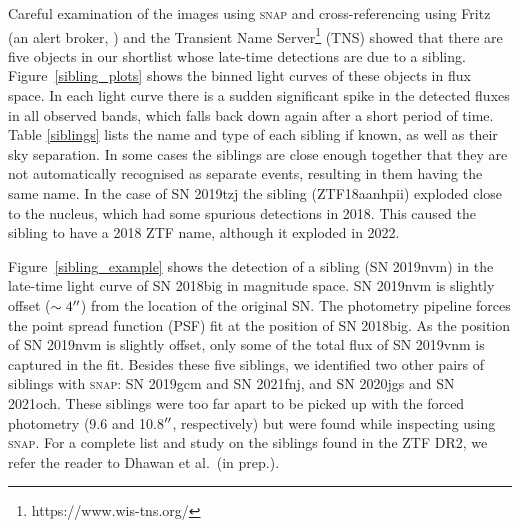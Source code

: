 \documentclass[a4paper,oneside,12pt, class=Latex/Classes/PhDthesisPSnPDF, crop=false]{standalone}
\begin{document}
Careful examination of the images using \textsc{snap} and cross-referencing using Fritz (an alert broker, \citealt{skyportal2019, duev2019realbogus, Kasliwal_Growth, Skyportal}) and the Transient Name Server\footnote{https://www.wis-tns.org/} (TNS) showed that there are five objects in our shortlist whose late-time detections are due to a sibling. Figure~\ref{sibling_plots} shows the binned light curves of these objects in flux space. In each light curve there is a sudden significant spike in the detected fluxes in all observed bands, which falls back down again after a short period of time. Table \ref{siblings} lists the name and type of each sibling if known, as well as their sky separation. In some cases the siblings are close enough together that they are not automatically recognised as separate events, resulting in them having the same name. In the case of SN 2019tzj the sibling (ZTF18aanhpii) exploded close to the nucleus, which had some spurious detections in 2018. This caused the sibling to have a 2018 ZTF name, although it exploded in 2022.

Figure~\ref{sibling_example} shows the detection of a sibling (SN 2019nvm) in the late-time light curve of SN 2018big in magnitude space. SN 2019nvm is slightly offset ($\sim4^{\prime\prime}$) from the location of the original SN. The photometry pipeline forces the point spread function (PSF) fit at the position of SN 2018big. As the position of SN 2019nvm is slightly offset, only some of the total flux of SN 2019vnm is captured in the fit. 
Besides these five siblings, we identified two other pairs of siblings with \textsc{snap}: SN 2019gcm and SN 2021fnj, and SN 2020jgs and SN 2021och. These siblings were too far apart to be picked up with the forced photometry (9.6 and 10.8$^{\prime\prime}$, respectively) but were found while inspecting using \textsc{snap}. For a complete list and study on the siblings found in the ZTF DR2, we refer the reader to Dhawan et al.~(in prep.).
\end{document}

